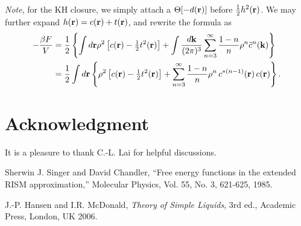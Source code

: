 \documentclass[12pt]{article}
\begin{document}
\emph{Note}, for the KH closure, we simply attach a $\Theta[-d(\mathbf{r})]$ before $\tfrac{1}{2}h^2(\mathbf{r})$.
%
We may further expand $h(\mathbf{r}) = c(\mathbf{r}) + t(\mathbf{r})$,
  and rewrite the formula as
%
\begin{align}
-\frac{\beta F}{V}
&=
  \frac{1}{2}
  \left\{
  \int d\mathbf{r} \rho^2
  \left[
     c(\mathbf{r})
    - \tfrac{1}{2} t^2(\mathbf{r})
  \right]
  +
  \int \frac{ d \mathbf{k} }{(2\pi)^3}
    \sum_{n = 3}^{\infty}
      \frac{1-n}{n} \rho^n \tilde{c}^n(\mathbf{k})
  \right\} \notag \\
&=
  \frac{1}{2}
  \int d\mathbf{r}
  \left\{
  \rho^2
  \left[
     c(\mathbf{r})
    - \tfrac{1}{2} t^2(\mathbf{r})
  \right]
  +
  \sum_{n = 3}^{\infty}
  \frac{1-n}{n} \rho^{n} \, c^{*(n-1)}(\mathbf{r}) \, c(\mathbf{r})
  \right\}.
\label{eq:freeEnergy_t2}
\end{align}
%



\section*{Acknowledgment}
It is a pleasure to thank C.-L. Lai for helpful discussions.


\begin{thebibliography}{100}

  Sherwin J. Singer and David Chandler,
  ``Free energy functions in the extended RISM approximation,''
  Molecular Physics, Vol. 55, No. 3, 621-625,
  1985.

  J.-P. Hansen and I.R. McDonald,
  {\it Theory of Simple Liquids}, 3rd ed.,
  Academic Press, London, UK 2006.

\end{thebibliography}
\end{document}
